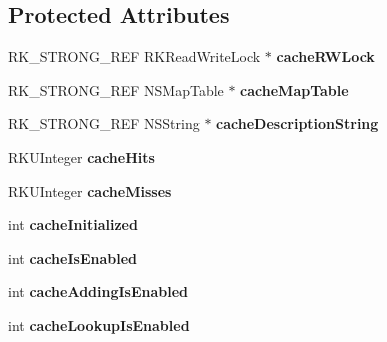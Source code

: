 \subsection*{Protected Attributes}
\begin{DoxyCompactItemize}
\item 
\hypertarget{interface_r_k_cache_ab4e09fa7e05abeb94c0aa3957d8a483f}{R\-K\-\_\-\-S\-T\-R\-O\-N\-G\-\_\-\-R\-E\-F R\-K\-Read\-Write\-Lock $\ast$ {\bfseries cache\-R\-W\-Lock}}\label{interface_r_k_cache_ab4e09fa7e05abeb94c0aa3957d8a483f}

\item 
\hypertarget{interface_r_k_cache_a32797a8c639c51289a8b9f1fe0339b52}{R\-K\-\_\-\-S\-T\-R\-O\-N\-G\-\_\-\-R\-E\-F N\-S\-Map\-Table $\ast$ {\bfseries cache\-Map\-Table}}\label{interface_r_k_cache_a32797a8c639c51289a8b9f1fe0339b52}

\item 
\hypertarget{interface_r_k_cache_aa6784aa3007a045f34a80dc626c1ae49}{R\-K\-\_\-\-S\-T\-R\-O\-N\-G\-\_\-\-R\-E\-F N\-S\-String $\ast$ {\bfseries cache\-Description\-String}}\label{interface_r_k_cache_aa6784aa3007a045f34a80dc626c1ae49}

\item 
\hypertarget{interface_r_k_cache_a58c7fc49e9a2c023de18ac3280a123bc}{R\-K\-U\-Integer {\bfseries cache\-Hits}}\label{interface_r_k_cache_a58c7fc49e9a2c023de18ac3280a123bc}

\item 
\hypertarget{interface_r_k_cache_ab5764e41e5901d38102a13c86ec45c32}{R\-K\-U\-Integer {\bfseries cache\-Misses}}\label{interface_r_k_cache_ab5764e41e5901d38102a13c86ec45c32}

\item 
\hypertarget{interface_r_k_cache_ac0fa84e1a8956476293f50ff844c122f}{int {\bfseries cache\-Initialized}}\label{interface_r_k_cache_ac0fa84e1a8956476293f50ff844c122f}

\item 
\hypertarget{interface_r_k_cache_a5d590c45304fcf52a73443a5fbfc71e5}{int {\bfseries cache\-Is\-Enabled}}\label{interface_r_k_cache_a5d590c45304fcf52a73443a5fbfc71e5}

\item 
\hypertarget{interface_r_k_cache_ad7ed0e393fef5cda5eca414255d1d3bb}{int {\bfseries cache\-Adding\-Is\-Enabled}}\label{interface_r_k_cache_ad7ed0e393fef5cda5eca414255d1d3bb}

\item 
\hypertarget{interface_r_k_cache_a72877458d42aa5b824fe309afd70db74}{int {\bfseries cache\-Lookup\-Is\-Enabled}}\label{interface_r_k_cache_a72877458d42aa5b824fe309afd70db74}


\end{DoxyCompactItemize}
